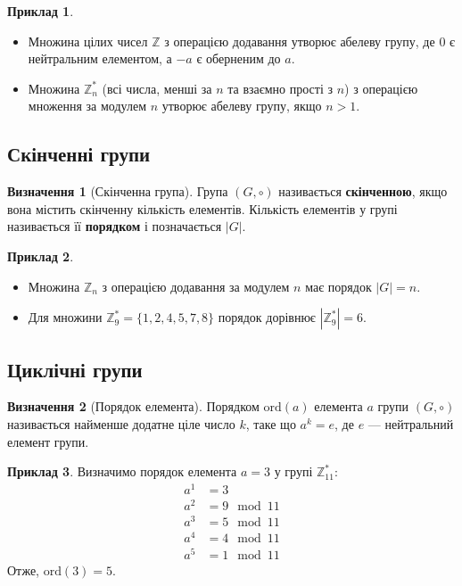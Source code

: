 \documentclass[12pt]{report}
\theoremstyle{definition}
\newtheorem{definition}{Визначення}[chapter]
\newtheorem{example}{Приклад}[chapter]
\theoremstyle{plain}
\begin{document}
\begin{example}
\begin{itemize}
    \item Множина цілих чисел \( \mathbb{Z} \) з операцією додавання утворює абелеву групу, де \( 0 \) є нейтральним елементом, а \( -a \) є оберненим до \( a \).
    \item Множина \( \mathbb{Z}^*_n \) (всі числа, менші за \( n \) та взаємно прості з \( n \)) з операцією множення за модулем \( n \) утворює абелеву групу, якщо \( n > 1 \).
\end{itemize}
\end{example}

\subsection{Скінченні групи}

\begin{definition}[Скінченна група]
Група \( (G, \circ) \) називається \textbf{скінченною}, якщо вона містить скінченну кількість елементів. Кількість елементів у групі називається її \textbf{порядком} і позначається \( |G| \).
\end{definition}

\begin{example}
\begin{itemize}
    \item Множина \( \mathbb{Z}_n \) з операцією додавання за модулем \( n \) має порядок \( |G| = n \).
    \item Для множини \( \mathbb{Z}^*_9 = \{1, 2, 4, 5, 7, 8\} \) порядок дорівнює \( |\mathbb{Z}^*_9| = 6 \).
\end{itemize}
\end{example}

\subsection{Циклічні групи}

\begin{definition}[Порядок елемента]
Порядком \( \text{ord}(a) \) елемента \( a \) групи \( (G, \circ) \) називається найменше додатне ціле число \( k \), таке що \( a^k = e \), де \( e \) — нейтральний елемент групи.
\end{definition}

\begin{example}
Визначимо порядок елемента \( a = 3 \) у групі \( \mathbb{Z}^*_{11} \):
\[
\begin{aligned}
a^1 & = 3 \\
a^2 & = 9 \mod 11 \\
a^3 & = 5 \mod 11 \\
a^4 & = 4 \mod 11 \\
a^5 & = 1 \mod 11
\end{aligned}
\]
Отже, \( \text{ord}(3) = 5 \).
\end{example}
\end{document}
